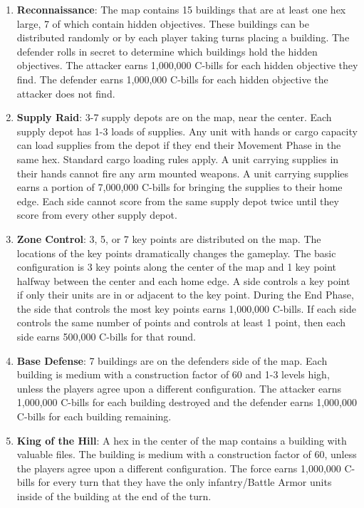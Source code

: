 \begin{enumerate}

\item {\bfseries Reconnaissance}: The map contains 15 buildings that are at least one hex large, 7 of which contain hidden objectives.
These buildings can be distributed randomly or by each player taking turns placing a building.
The defender rolls in secret to determine which buildings hold the hidden objectives.
The attacker earns 1,000,000 C-bills for each hidden objective they find.
The defender earns 1,000,000 C-bills for each hidden objective the attacker does not find.

\item {\bfseries Supply Raid}: 3-7 supply depots are on the map, near the center.
Each supply depot has 1-3 loads of supplies.
Any unit with hands or cargo capacity can load supplies from the depot if they end their Movement Phase in the same hex.
Standard cargo loading rules apply.
A unit carrying supplies in their hands cannot fire any arm mounted weapons.
A unit carrying supplies earns a portion of 7,000,000 C-bills for bringing the supplies to their home edge.
Each side cannot score from the same supply depot twice until they score from every other supply depot.

\item {\bfseries Zone Control}: 3, 5, or 7 key points are distributed on the map.
The locations of the key points dramatically changes the gameplay.
The basic configuration is 3 key points along the center of the map and 1 key point halfway between the center and each home edge.
A side controls a key point if only their units are in or adjacent to the key point.
During the End Phase, the side that controls the most key points earns 1,000,000 C-bills.
If each side controls the same number of points and controls at least 1 point, then each side earns 500,000 C-bills for that round.

\item {\bfseries Base Defense}: 7 buildings are on the defenders side of the map.
Each building is medium with a construction factor of 60 and 1-3 levels high, unless the players agree upon a different configuration.
The attacker earns 1,000,000 C-bills for each building destroyed and the defender earns 1,000,000 C-bills for each building remaining.

\item {\bfseries King of the Hill}: A hex in the center of the map contains a building with valuable files.
The building is medium with a construction factor of 60, unless the players agree upon a different configuration.
The force earns 1,000,000 C-bills for every turn that they have the only infantry/Battle Armor units inside of the building at the end of the turn.


\end{enumerate}
